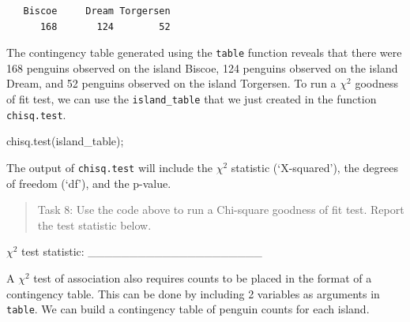 \documentclass[
]{scrbook}
\newenvironment{Shaded}{\begin{snugshade}}{\end{snugshade}}
\newcommand{\FunctionTok}[1]{\textcolor[rgb]{0.00,0.00,0.00}{#1}}
\newcommand{\NormalTok}[1]{#1}
\newcommand{\OtherTok}[1]{\textcolor[rgb]{0.56,0.35,0.01}{#1}}
\newcommand{\SpecialCharTok}[1]{\textcolor[rgb]{0.00,0.00,0.00}{#1}}
\begin{document}
\begin{Shaded}
\end{Shaded}

\begin{verbatim}
   Biscoe     Dream Torgersen 
      168       124        52 
\end{verbatim}

The contingency table generated using the \texttt{table} function reveals that there were 168 penguins observed on the island Biscoe, 124 penguins observed on the island Dream, and 52 penguins observed on the island Torgersen.
To run a \(\chi^{2}\) goodness of fit test, we can use the \texttt{island\_table} that we just created in the function \texttt{chisq.test}.

\begin{Shaded}
\begin{Highlighting}[]
\FunctionTok{chisq.test}\NormalTok{(island\_table);}
\end{Highlighting}
\end{Shaded}

The output of \texttt{chisq.test} will include the \(\chi^{2}\) statistic (`X-squared'), the degrees of freedom (`df'), and the p-value.

\begin{quote}
Task 8: Use the code above to run a Chi-square goodness of fit test. Report the test statistic below.
\end{quote}

\(\chi^{2}\) test statistic: \_\_\_\_\_\_\_\_\_\_\_\_\_\_\_\_\_\_\_\_\_

A \(\chi^{2}\) test of association also requires counts to be placed in the format of a contingency table.
This can be done by including 2 variables as arguments in \texttt{table}.
We can build a contingency table of penguin counts for each island.

\begin{Shaded}
\end{Shaded}
\end{document}
